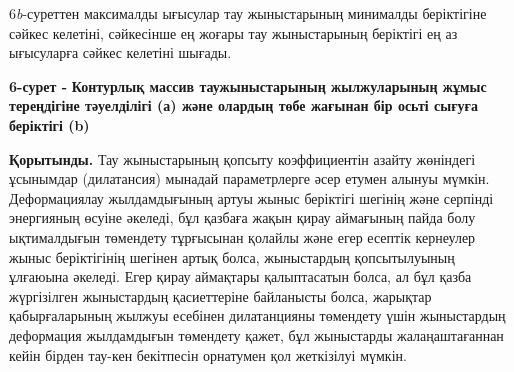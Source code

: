 6\emph{b}-суреттен максималды ығысулар тау жыныстарының минималды
беріктігіне сәйкес келетіні, сәйкесінше ең жоғары тау жыныстарының
беріктігі ең аз ығысуларға сәйкес келетіні шығады.


{\bfseries 6-сурет -} {\bfseries Контурлық массив таужыныстарының жылжуларының
жұмыс тереңдігіне тәуелділігі (а) және олардың төбе жағынан бір осьті
сығуға беріктігі (b)}

{\bfseries Қорытынды.} Тау жыныстарының қопсыту коэффициентін азайту
жөніндегі ұсынымдар (дилатансия) мынадай параметрлерге әсер етумен
алынуы мүмкін. Деформациялау жылдамдығының артуы жыныс беріктігі шегінің
және серпінді энергияның өсуіне әкеледі, бұл қазбаға жақын қирау
аймағының пайда болу ықтималдығын төмендету тұрғысынан қолайлы және егер
есептік кернеулер жыныс беріктігінің шегінен артық болса, жыныстардың
қопсытылуының ұлғаюына әкеледі. Егер қирау аймақтары қалыптасатын болса,
ал бұл қазба жүргізілген жыныстардың қасиеттеріне байланысты болса,
жарықтар қабырғаларының жылжуы есебінен дилатанцияны төмендету үшін
жыныстардың деформация жылдамдығын төмендету қажет, бұл жыныстарды
жалаңаштағаннан кейін бірден тау-кен бекітпесін орнатумен қол жеткізілуі
мүмкін.

